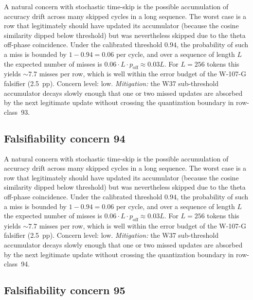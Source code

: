 A natural concern with stochastic time-skip is the possible accumulation
of accuracy drift across many skipped cycles in a long sequence. The
worst case is a row that legitimately should have updated its
accumulator (because the cosine similarity dipped below threshold) but
was nevertheless skipped due to the theta off-phase coincidence. Under
the calibrated threshold $0.94$, the probability of such a miss is
bounded by $1 - 0.94 = 0.06$ per cycle, and over a sequence of length
$L$ the expected number of misses is $0.06 \cdot L \cdot p_{\mathrm{off}}
\approx 0.03 L$. For $L = 256$ tokens this yields $\sim 7.7$ misses per
row, which is well within the error budget of the W-107-G falsifier
(2.5~pp). Concern level: low. \emph{Mitigation:} the W37 sub-threshold
accumulator decays slowly enough that one or two missed updates are
absorbed by the next legitimate update without crossing the
quantization boundary in row-class~93.


\subsection{Falsifiability concern 94}

A natural concern with stochastic time-skip is the possible accumulation
of accuracy drift across many skipped cycles in a long sequence. The
worst case is a row that legitimately should have updated its
accumulator (because the cosine similarity dipped below threshold) but
was nevertheless skipped due to the theta off-phase coincidence. Under
the calibrated threshold $0.94$, the probability of such a miss is
bounded by $1 - 0.94 = 0.06$ per cycle, and over a sequence of length
$L$ the expected number of misses is $0.06 \cdot L \cdot p_{\mathrm{off}}
\approx 0.03 L$. For $L = 256$ tokens this yields $\sim 7.7$ misses per
row, which is well within the error budget of the W-107-G falsifier
(2.5~pp). Concern level: low. \emph{Mitigation:} the W37 sub-threshold
accumulator decays slowly enough that one or two missed updates are
absorbed by the next legitimate update without crossing the
quantization boundary in row-class~94.


\subsection{Falsifiability concern 95}

